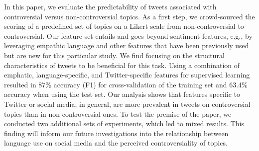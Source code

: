 In this paper, we evaluate the predictability of tweets associated with controversial versus non-controversial topics. As a first step, we crowd-sourced the scoring of a predefined set of topics on a Likert scale from non-controversial to controversial. Our feature set entails and goes beyond sentiment features, e.g., by leveraging empathic language and other features that have been previously used but are new for this particular study. We find focusing on the structural characteristics of tweets to be beneficial for this task. Using a combination of emphatic, language-specific, and Twitter-specific features for supervised learning resulted in 87\% accuracy (F1) for cross-validation of the training set and 63.4\% accuracy when using the test set. Our analysis shows that features specific to Twitter or social media, in general, are more prevalent in tweets on controversial topics than in non-controversial ones. To test the premise of the paper, we conducted two additional sets of experiments, which led to mixed results. This finding will inform our future investigations into the relationship between language use on social media and the perceived controversiality of topics.
